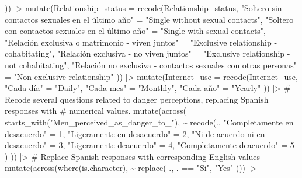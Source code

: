 \documentclass[
  bookmarksnumbered]{article}
\newenvironment{Shaded}{\begin{snugshade}}{\end{snugshade}}
\newcommand{\AttributeTok}[1]{\textcolor[rgb]{0.80,0.80,0.80}{#1}}
\newcommand{\CommentTok}[1]{\textcolor[rgb]{0.50,0.62,0.50}{#1}}
\newcommand{\DecValTok}[1]{\textcolor[rgb]{0.86,0.86,0.80}{#1}}
\newcommand{\FunctionTok}[1]{\textcolor[rgb]{0.94,0.94,0.56}{#1}}
\newcommand{\NormalTok}[1]{\textcolor[rgb]{0.80,0.80,0.80}{#1}}
\newcommand{\OtherTok}[1]{\textcolor[rgb]{0.94,0.94,0.56}{#1}}
\newcommand{\SpecialCharTok}[1]{\textcolor[rgb]{0.86,0.64,0.64}{#1}}
\newcommand{\StringTok}[1]{\textcolor[rgb]{0.80,0.58,0.58}{#1}}
\begin{document}
\begin{Shaded}
\begin{Highlighting}[]
\NormalTok{  )) }\SpecialCharTok{|\textgreater{}}
  \FunctionTok{mutate}\NormalTok{(}\AttributeTok{Relationship\_status =} \FunctionTok{recode}\NormalTok{(Relationship\_status,}
    \StringTok{"Soltero sin contactos sexuales en el último año"} \OtherTok{=}
      \StringTok{"Single without sexual contacts"}\NormalTok{,}
    \StringTok{"Soltero con contactos sexuales en el último año"} \OtherTok{=}
      \StringTok{"Single with sexual contacts"}\NormalTok{,}
    \StringTok{"Relación exclusiva o matrimonio {-} viven juntos"} \OtherTok{=}
      \StringTok{"Exclusive relationship {-} cohabitating"}\NormalTok{,}
    \StringTok{"Relación exclusiva {-} no viven juntos"} \OtherTok{=}
      \StringTok{"Exclusive relationship {-} not cohabitating"}\NormalTok{,}
    \StringTok{"Relación no exclusiva {-} contactos sexuales con otras personas"} \OtherTok{=}
      \StringTok{"Non{-}exclusive relationship"}
\NormalTok{  )) }\SpecialCharTok{|\textgreater{}}
  \FunctionTok{mutate}\NormalTok{(}\AttributeTok{Internet\_use =} \FunctionTok{recode}\NormalTok{(Internet\_use,}
    \StringTok{"Cada día"} \OtherTok{=} \StringTok{"Daily"}\NormalTok{,}
    \StringTok{"Cada mes"} \OtherTok{=} \StringTok{"Monthly"}\NormalTok{,}
    \StringTok{"Cada año"} \OtherTok{=} \StringTok{"Yearly"}
\NormalTok{  )) }\SpecialCharTok{|\textgreater{}}
  \CommentTok{\# Recode several questions related to danger perceptions, replacing Spanish responses with}
  \CommentTok{\# numerical values.}
  \FunctionTok{mutate}\NormalTok{(}\FunctionTok{across}\NormalTok{(}
    \FunctionTok{starts\_with}\NormalTok{(}\StringTok{"Men\_perceived\_as\_danger\_to\_"}\NormalTok{),}
    \SpecialCharTok{\textasciitilde{}} \FunctionTok{recode}\NormalTok{(.,}
      \StringTok{"Completamente en desacuerdo"} \OtherTok{=} \DecValTok{1}\NormalTok{,}
      \StringTok{"Ligeramente en desacuerdo"} \OtherTok{=} \DecValTok{2}\NormalTok{,}
      \StringTok{"Ni de acuerdo ni en desacuerdo"} \OtherTok{=} \DecValTok{3}\NormalTok{,}
      \StringTok{"Ligeramente deacuerdo"} \OtherTok{=} \DecValTok{4}\NormalTok{,}
      \StringTok{"Completamente deacuerdo"} \OtherTok{=} \DecValTok{5}
\NormalTok{    )}
\NormalTok{  )) }\SpecialCharTok{|\textgreater{}}
  \CommentTok{\# Replace Spanish responses with corresponding English values}
  \FunctionTok{mutate}\NormalTok{(}\FunctionTok{across}\NormalTok{(}\FunctionTok{where}\NormalTok{(is.character), }\SpecialCharTok{\textasciitilde{}} \FunctionTok{replace}\NormalTok{(}
\NormalTok{    ., . }\SpecialCharTok{==}
      \StringTok{"Si"}\NormalTok{,}
    \StringTok{"Yes"}
\NormalTok{  ))) }\SpecialCharTok{|\textgreater{}}

\end{Highlighting}
\end{Shaded}
\end{document}
